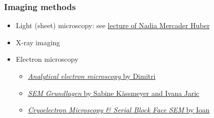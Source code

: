 \begin{frame}
	\frametitle{Imaging methods}
 	\begin{itemize}
 		\item Light (sheet) microscopy: see \href{https://ilias.unibe.ch/goto_ilias3_unibe_sess_2177945.html}{lecture of Nadia Mercader Huber}
 		\item X-ray imaging
 		\item Electron microscopy
 		\begin{itemize}
 			\item \href{https://moodle.bfh.ch/course/section.php?id=546756}{\emph{Analytical electron microscopy} by Dimitri}
 			\item \href{https://ilias.unibe.ch/goto_ilias3_unibe_sess_2177954.html}{\emph{SEM Grundlagen} by Sabine Kässmeyer and Ivana Jaric}
 			\item \href{https://ilias.unibe.ch/goto_ilias3_unibe_sess_2177956.html}{\emph{Cryoelectron Microscopy \& Serial Block Face SEM} by Ioan}
 		\end{itemize}
 	\end{itemize}
 \end{frame}

